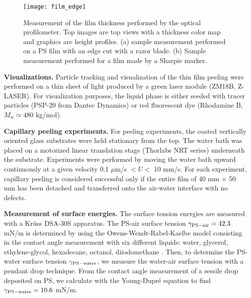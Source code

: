 \documentclass[10pt,twocolumn]{article}
\begin{document}
 \begin{figure}[h]
     \center
     \texttt{[image: film\_edge]}%
     \caption{Measurement of the film thickness performed by the optical profilometer.
     Top images are top views with a thickness color map and graphics are height profiles.
     (a) sample measurement performed on a PS film with an edge cut with a razor blade.
     (b) Sample measurement performed for a film made by a Sharpie\textsuperscript{\textregistered} marker.}
     \label{fig:FilmEdge}
 \end{figure}


{\bf{Visualizations.}} Particle tracking and visualization  of the thin film peeling were performed on a thin sheet of light produced by a green laser module (ZM18B, Z-LASER).
For visualization purposes, the liquid phase is either seeded with tracer particles (PSP-20 from Dantec Dynamics) or red fluorescent dye (Rhodamine B, $M_w \simeq 480$ kg/mol).


{\bf{Capillary peeling experiments.}} For peeling experiments, the coated vertically oriented glass substrates were held stationary from the top.
The water bath was placed on a motorized linear translation stage (Thorlabs NRT series) underneath the substrate.
Experiments were performed by moving the water bath upward continuously at a given velocity 0.1 $\mu$m/s $< U <$ 10  mm/s.
For each experiment, capillary peeling is considered successful only if the entire film of 40 mm $\times$ 50 mm has been detached and transferred onto the air-water interface with no defects.


{\bf {Measurement of surface energies.}} The surface tension energies are measured with a Kr\"uss DSA-30S apparatus.
The PS-air surface tension $\gamma_{{\rm PS-air}} = 42.3$ mN/m is determined by using the Owens-Wendt-Rabel-Kaelbe model consisting in the contact angle measurement with six different liquids: water, glycerol, ethylene-glycol, hexadecane, octanol, diiodomethane \cite{Owens1969}.
Then, to determine the PS-water surface tension $\gamma_{{\rm PS-water}}$, we measure the water-air surface tension with a pendant drop technique.
From the contact angle measurement of a sessile drop deposited on PS, we calculate with the Young-Dupr\'e equation to find $\gamma_{{\rm PS-water}}=10.6$ mN/m.
\end{document}
